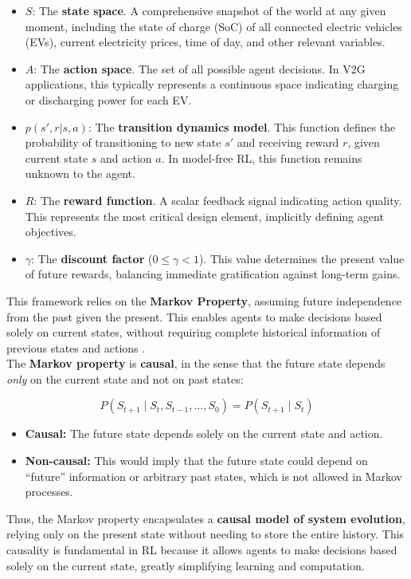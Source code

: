 \begin{itemize}
    \item $S$: The \textbf{state space}. A comprehensive snapshot of the world at any given moment, including the state of charge (SoC) of all connected electric vehicles (EVs), current electricity prices, time of day, and other relevant variables.
    
    \item $A$: The \textbf{action space}. The set of all possible agent decisions. In V2G applications, this typically represents a continuous space indicating charging or discharging power for each EV.
    
    \item $p(s', r | s, a)$: The \textbf{transition dynamics model}. This function defines the probability of transitioning to new state $s'$ and receiving reward $r$, given current state $s$ and action $a$. In model-free RL, this function remains unknown to the agent.
    
    \item $R$: The \textbf{reward function}. A scalar feedback signal indicating action quality. This represents the most critical design element, implicitly defining agent objectives.
    
    \item $\gamma$: The \textbf{discount factor} ($0 \le \gamma < 1$). This value determines the present value of future rewards, balancing immediate gratification against long-term gains.
\end{itemize}
\noindent
This framework relies on the \textbf{Markov Property}, assuming future independence from the past given the present. This enables agents to make decisions based solely on current states, without requiring complete historical information of previous states and actions \cite{Qiu2023}.
\noindent
\\
The \textbf{Markov property} is \textbf{causal}, in the sense that the future state depends \emph{only} on the current state and not on past states:

\begin{equation}
P(S_{t+1} \mid S_t, S_{t-1}, \dots, S_0) = P(S_{t+1} \mid S_t)
\end{equation}

\begin{itemize}
    \item \textbf{Causal:} The future state depends solely on the current state and action.  
    \item \textbf{Non-causal:} This would imply that the future state could depend on “future” information or arbitrary past states, which is not allowed in Markov processes.
\end{itemize}
\noindent
Thus, the Markov property encapsulates a \textbf{causal model of system evolution}, relying only on the present state without needing to store the entire history. This causality is fundamental in RL because it allows agents to make decisions based solely on the current state, greatly simplifying learning and computation.


